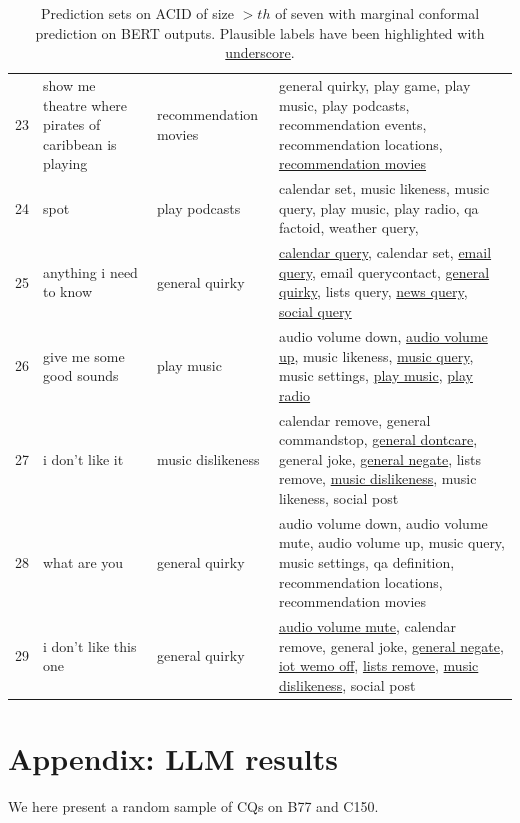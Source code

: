 \documentclass[11pt]{article}
\begin{document}
\begin{table}[h!]
\begin{tabular}{l p{} p{} p{}}
23 & show me theatre where pirates of caribbean is playing & recommendation movies & general quirky, play game, play music, play podcasts, recommendation events, recommendation locations, \underline{recommendation movies} \\
24 & spot & play podcasts & calendar set, music likeness, music query, play music, play radio, qa factoid, weather query,  \\
25 & anything i need to know & general quirky & \underline{calendar query}, calendar set, \underline{email query}, email querycontact, \underline{general quirky}, lists query, \underline{news query}, \underline{social query} \\
26 & give me some good sounds & play music & audio volume down, \underline{audio volume up}, music likeness, \underline{music query}, music settings, \underline{play music}, \underline{play radio} \\
27 & i don't like it & music dislikeness & calendar remove, general commandstop, \underline{general dontcare}, general joke, \underline{general negate}, lists remove, \underline{music dislikeness}, music likeness, social post \\
28 & what are you & general quirky & audio volume down, audio volume mute, audio volume up, music query, music settings, qa definition, recommendation locations, recommendation movies \\
29 & i don't like this one & general quirky & \underline{audio volume mute}, calendar remove, general joke, \underline{general negate}, \underline{iot wemo off}, \underline{lists remove}, \underline{music dislikeness}, social post \\
         \bottomrule
    \end{tabular}
    \caption{Prediction sets on ACID of size $>th$ of seven with marginal conformal prediction on BERT outputs. Plausible labels have been highlighted with \underline{underscore}.}
    \label{tab:ambiguous_inputs1}
\end{table}

\section{Appendix: LLM results}
We here present a random sample of CQs on B77 and C150.
\end{document}
